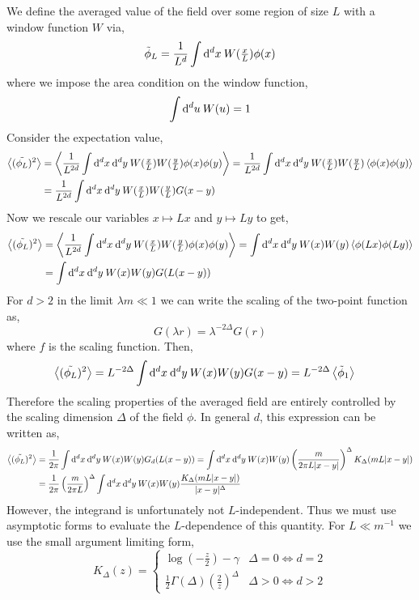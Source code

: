 \documentclass[12pt]{article}
\begin{document}
We define the averaged value of the field over some region of size $L$ with a window function $W$ via,
\[ \tilde{\phi}_L = \frac{1}{L^d} \int \mathrm{d}^{d} x \: W(\tfrac{x}{L}) \phi(x) \]
where we impose the area condition on the window function,
\[ \int \mathrm{d}^{d} u \: W(u) = 1 \]
Consider the expectation value,
\begin{align*}
\left< (\tilde{\phi_L})^2 \right> & = \left< \frac{1}{L^{2d}} \int \mathrm{d}^{d} x \: \mathrm{d}^{d} y \: W(\tfrac{x}{L}) W(\tfrac{y}{L}) \phi(x) \phi(y) \right> = \frac{1}{L^{2d}} \int \mathrm{d}^{d} x \: \mathrm{d}^{d} y \: W(\tfrac{x}{L}) W(\tfrac{y}{L}) \left< \phi(x) \phi(y) \right>
\\
& = \frac{1}{L^{2d}} \int \mathrm{d}^{d} x \: \mathrm{d}^{d} y \: W(\tfrac{x}{L}) W(\tfrac{y}{L}) G(x - y)
\end{align*}
Now we rescale our variables $x \mapsto L x$ and $y \mapsto L y$ to get,
\begin{align*}
\left< (\tilde{\phi_L})^2 \right> & = \left< \frac{1}{L^{2d}} \int \mathrm{d}^{d} x \: \mathrm{d}^{d} y \: W(\tfrac{x}{L}) W(\tfrac{y}{L}) \phi(x) \phi(y) \right> = \int \mathrm{d}^{d} x \: \mathrm{d}^{d} y \: W(x) W(y) \left< \phi(Lx) \phi(Ly) \right>
\\
& = \int \mathrm{d}^{d} x \: \mathrm{d}^{d} y \: W(x) W(y) G(L(x - y))
\end{align*}
For $d > 2$ in the limit $\lambda m \ll 1$ we can write the scaling of the two-point function as,
\[ G(\lambda r) = \lambda^{- 2 \Delta} G(r) \]
where $f$ is the scaling function. Then,
\begin{align*}
\left< (\tilde{\phi_L})^2 \right> & = L^{- 2 \Delta} \int \mathrm{d}^{d} x \: \mathrm{d}^{d} y \: W(x) W(y) G(x - y) = L^{-2 \Delta} \left< \tilde{\phi}_1 \right> 
\end{align*}
Therefore the scaling properties of the averaged field are entirely controlled by the scaling dimension $\Delta$ of the field $\phi$. In general $d$, this expression can be written as, 
\begin{align*}
\left< (\tilde{\phi_L})^2 \right> & = \frac{1}{2 \pi} \int \mathrm{d}^{d} x \: \mathrm{d}^{d} y \: W(x) W(y) G_d(L(x - y)) = \int \mathrm{d}^{d} x \: \mathrm{d}^{d} y \: W(x) W(y)  \left( \frac{m}{2 \pi L |x - y|} \right)^{\Delta} K_{\Delta}(mL|x - y|) 
\\
& = \frac{1}{2 \pi} \left( \frac{m}{2 \pi L} \right)^{\Delta} \int \mathrm{d}^{d} x \: \mathrm{d}^{d} y \: W(x) W(y) \frac{K_{\Delta}(mL|x - y|)}{|x - y|^\Delta} 
\end{align*}
However, the integrand is unfortunately not $L$-independent. Thus we must use asymptotic forms to evaluate the $L$-dependence of this quantity. For $L \ll m^{-1}$ we use the small argument limiting form,
\[ K_{\Delta}(z) = 
\begin{cases}
\log{\left( - \frac{z}{2} \right)} - \gamma & \Delta = 0 \iff d = 2 
\\
\frac{1}{2} \Gamma(\Delta) \left(\frac{2}{z}\right)^\Delta & \Delta > 0 \iff d > 2 
\end{cases} \]
\end{document}
